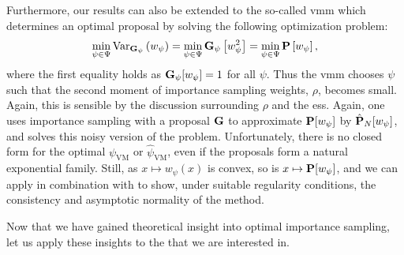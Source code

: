 Furthermore, our results can also be extended to the so-called \gls{vmm} which determines an optimal proposal by solving the following optimization problem:
$$
\min_{\psi\in\Psi} \var_{\G_{\psi}} \left( w_{\psi}  \right) = \min_{\psi \in \Psi} \G_{\psi} \left[w_{\psi}^2\right] = \min_{\psi\in\Psi} \P \left[w_{\psi} \right],
$$
where the first equality holds as $\G_{\psi}[w_{\psi}] = 1$ for all $\psi$. Thus the \acrshort{vmm} chooses $\psi$ such that the second moment of importance sampling weights, $\rho$, becomes small. Again, this is sensible by the discussion surrounding $\rho$ and the \acrshort{ess}. Again, one uses importance sampling with a proposal $\G$ to approximate $\P [w_{\psi}]$ by $\hat\P_{N} [w_{\psi}]$, and solves this noisy version of the problem.
Unfortunately, there is no closed form for the optimal $\psi_{\text{VM}}$ or $\hat\psi_{\text{VM}}$, even if the proposals form a natural exponential family. Still, as $x \mapsto w_{\psi}(x)$ is convex, so is $x \mapsto \P [w_{\psi}]$, and we can apply  in combination with  to show, under suitable regularity conditions, the consistency and asymptotic normality of the method. 

Now that we have gained theoretical insight into optimal importance sampling, let us apply these insights to the  that we are interested in.
